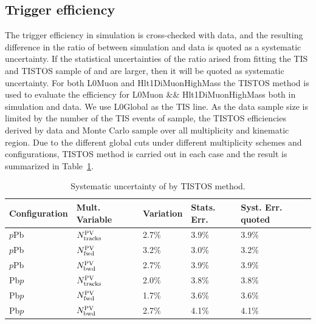 \subsection{Trigger efficiency}
The trigger efficiency in simulation is cross-checked with data, and the resulting difference in the ratio of \effTrigger between simulation and data is quoted as a systematic uncertainty. If the statistical uncertainties of the ratio arised from fitting the TIS and TISTOS sample of \jpsi and \psitwos are larger, then it will be quoted as systematic uncertainty. 
For both L0Muon and Hlt1DiMuonHighMass the TISTOS method is used to evaluate the efficiency for L0Muon \&\& Hlt1DiMuonHighMass both in simulation and data. We use L0Global as the TIS line. As the data sample size is limited by the number of the TIS events of \psitwos sample, the TISTOS efficiencies derived by data and Monte Carlo sample over all multiplicity and kinematic region. Due to the different global cuts under different multiplicity schemes and configurations, TISTOS method is carried out in each case and the result is summarized in Table~\ref{TISTOStable}.
\begin{table}[H]
\caption{Systematic uncertainty of \effTrigger by TISTOS method.}
\begin{center}
\begin{tabular}{lllll}
\hline
\textbf{Configuration} & \textbf{Mult. Variable} & \textbf{Variation} & \textbf{Stats. Err.} & \textbf{Syst. Err. quoted}  \\
\hline
	$p$Pb & $N_{\rm tracks}^{\rm PV}$ & 2.7\% & 3.9\% & 3.9\%\\
	$p$Pb & $N_{\rm fwd}^{\rm PV}$ & 3.2\% & 3.0\% & 3.2\%\\
	$p$Pb & $N_{\rm bwd}^{\rm PV}$ & 2.7\% & 3.9\% & 3.9\% \\
        Pb$p$ & $N_{\rm tracks}^{\rm PV}$ & 2.0\% & 3.8\% & 3.8\% \\
        Pb$p$ & $N_{\rm fwd}^{\rm PV}$ &  1.7\% & 3.6\% & 3.6\%\\
        Pb$p$ & $N_{\rm bwd}^{\rm PV}$ &  2.7\% & 4.1\% & 4.1\%\\
\hline
\end{tabular}
\label{TISTOStable}
\end{center}
\end{table}
